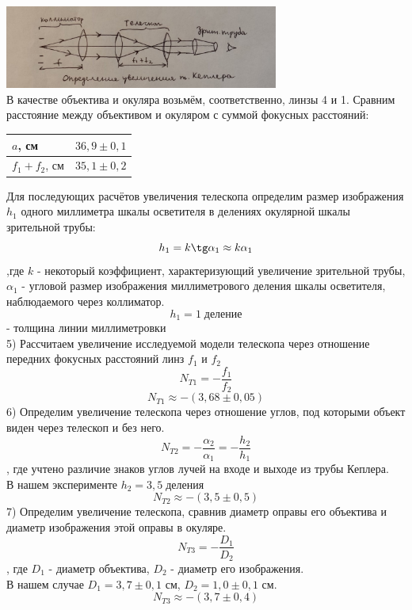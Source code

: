 \documentclass[a4paper]{article}
\begin{document}
\begin{multicols}{2}
\begin{enumerate}
\begin{enumerate}
\includegraphics[width=9cm]{exp5}\\
В качестве объектива и окуляра возьмём, соответственно, линзы 4 и 1. Сравним расстояние между объективом и окуляром с суммой фокусных расстояний:
\begin{center}
\begin{tabular}{|l|l|}
\hline
$a$, см & $36,9 \pm 0,1$\\
\hline
$f_1 + f_2$, см & $35,1 \pm 0,2$\\
\hline
\end{tabular}
\end{center}
Для последующих расчётов увеличения телескопа определим размер изображения $h_1$ одного миллиметра шкалы осветителя в делениях окулярной шкалы зрительной трубы:
$$h_1 = k \tg \alpha_1 \approx k\alpha_1$$
,где $k$ - некоторый коэффициент, характеризующий увеличение зрительной трубы, $\alpha_1$ - угловой размер изображения миллиметрового деления шкалы осветителя, наблюдаемого через коллиматор.
$$h_1 = 1 \; \textit{деление}$$ 
- толщина линии миллиметровки\\
5) Рассчитаем увеличение исследуемой модели телескопа через отношение передних фокусных расстояний линз $f_1$ и $f_2$
$$N_{T1} = - \frac{f_1}{f_2}$$
$$N_{T1} \approx - (3,68 \pm 0,05)$$
6) Определим увеличение телескопа через отношение углов, под которыми объект виден через телескоп и без него.\\
$$N_{T2} = - \frac{\alpha_2}{\alpha_1} = - \frac{h_2}{h_1}$$
, где учтено различие знаков углов лучей на входе и выходе из трубы Кеплера.\\
В нашем эксперименте $h_2 = 3,5 \; \textit{деления}$
$$N_{T2} \approx - (3,5 \pm 0,5)$$
7) Определим увеличение телескопа, сравнив диаметр оправы его объектива и диаметр изображения этой оправы в окуляре. \\
$$N_{T3} = - \frac{D_1}{D_2}$$
, где $D_1$ - диаметр объектива, $D_2$ - диаметр его изображения.\\
В нашем случае $D_1 = 3,7 \pm 0,1$ см, $D_2 = 1,0 \pm 0,1$ см.\\
$$N_{T3} \approx - (3,7 \pm 0,4)$$



\end{enumerate}
\end{enumerate}
\end{multicols}
\end{document}

